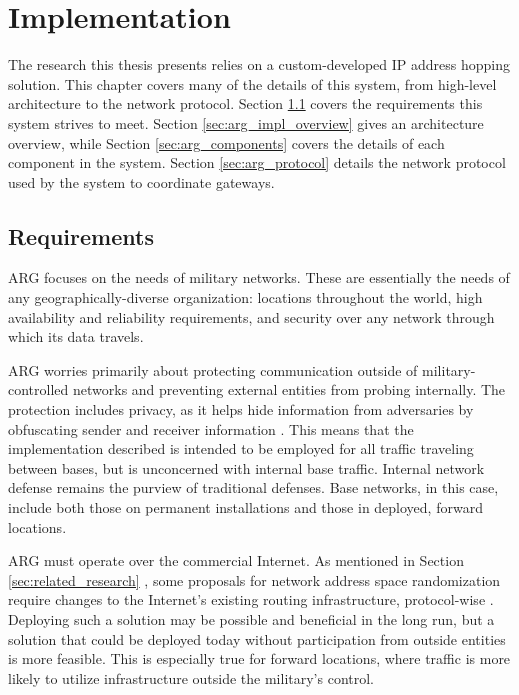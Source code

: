 \chapter{Implementation}
\label{chp:implementation}

\par The research this thesis presents relies on a custom-developed \ac{IP} address hopping solution. This chapter covers many of the details of this system, from high-level architecture to the network protocol. Section \ref{sec:arg_requirements} covers the requirements this system strives to meet. Section \ref{sec:arg_impl_overview} gives an architecture overview, while Section \ref{sec:arg_components} covers the details of each component in the system. Section \ref{sec:arg_protocol} details the network protocol used by the system to coordinate gateways.

\section{Requirements}
\label{sec:arg_requirements}
\par \ac{ARG} focuses on the needs of military networks. These are essentially the needs of any geographically-diverse organization: locations throughout the world, high availability and reliability requirements, and security over any network through which its data travels. 

\par ARG worries primarily about protecting communication outside of military-controlled networks and preventing external entities from probing internally. The protection includes privacy, as it helps hide information from adversaries by obfuscating sender and receiver information \cite{NetworkBasedPrivacy}. This means that the implementation described is intended to be employed for all traffic traveling between bases, but is unconcerned with internal base traffic. Internal network defense remains the purview of traditional defenses. Base networks, in this case, include both those on permanent installations and those in deployed, forward locations. 

\par ARG must operate over the commercial Internet. As mentioned in Section \ref{sec:related_research} , some proposals for network address space randomization require changes to the Internet's existing routing infrastructure, protocol-wise \cite{CONTRA}. Deploying such a solution may be possible and beneficial in the long run, but a solution that could be deployed today without participation from outside entities is more feasible. This is especially true for forward locations, where traffic is more likely to utilize infrastructure outside the military's control.

